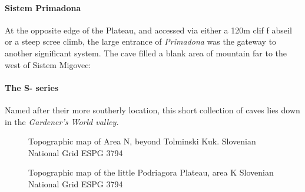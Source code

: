 \paragraph{Sistem Primadona} At the opposite edge of the Plateau, and accessed via either a 120m clif f abseil or a steep scree climb, the large entrance of \emph{Primadona} was the gateway to another significant system. The cave filled a blank area of mountain far to the west of Sistem Migovec: 

\paragraph{The S- series} Named after their more southerly location, this short collection of caves lies down in   the \emph{Gardener's World valley.}

 
 \begin{figure*}[t!]
 \checkoddpage \ifoddpage \forcerectofloat \else \forceversofloat \fi
\centering
  \label{map m}
  \caption{Topographic map of Area N, beyond Tolminski Kuk. Slovenian National Grid ESPG 3794}
 \end{figure*}
 
 \begin{figure*}[t!]
 \checkoddpage \ifoddpage \forcerectofloat \else \forceversofloat \fi
\centering
  \label{map m}
  \caption{Topographic map of the little Podriagora Plateau, area K Slovenian National Grid ESPG 3794}
 \end{figure*}
 
 